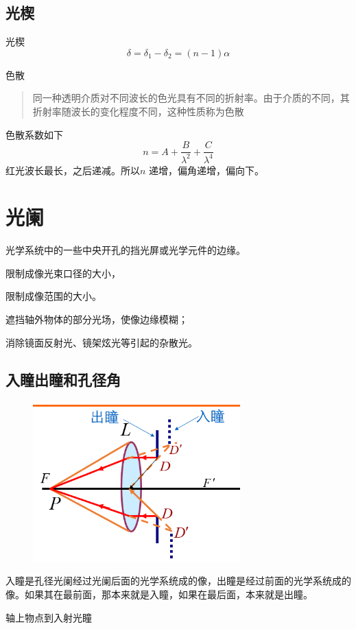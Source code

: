 \subsection{光楔}
光楔
\begin{equation}
    \delta = \delta _ { 1 } - \delta _ { 2 }=( n - 1 ) \alpha \tag{4.4.3}
\end{equation}

色散

\begin{quote}
{\ccwd\kaishu{}
同一种透明介质对不同波长的色光具有不同的折射率。由于介质的不同，其折射率随波长的变化程度不同，这种性质称为色散
}
\end{quote}

色散系数如下
\begin{equation}
    n=A+ \frac{B}{\lambda ^{2}}+ \frac{C}{\lambda ^{4}} \tag{4.4.5}
\end{equation}
红光波长最长，之后递减。所以$n$ 递增，偏角递增，偏向下。
\section{光阑}
\begin{description}[leftmargin=1.7cm,style=nextline,nosep]%
    \item[光阑 ]  光学系统中的一些中央开孔的挡光屏或光学元件的边缘。
    \item[孔径光阑    ] 限制成像光束口径的大小，
    \item[视场光阑    ] 限制成像范围的大小。
    \item[渐晕光阑
    ]遮挡轴外物体的部分光场，使像边缘模糊；

    
    \item[消杂光光阑    ]  消除镜面反射光、镜架炫光等引起的杂散光。

\end{description}
\subsection{入瞳出瞳和孔径角}
        \begin{figure}[H]
            \centering
            \includegraphics[width=8cm]{img/4.1.png}
            \end{figure}
入瞳是孔径光阑经过光阑后面的光学系统成的像，出瞳是经过前面的光学系统成的像。如果其在最前面，那本来就是入瞳，如果在最后面，本来就是出瞳。
\begin{description}[leftmargin=0.7cm,style=nextline,nosep]%
    \item[物方孔径角] 轴上物点到入射光瞳 
\end{description}
